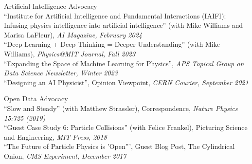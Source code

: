 \item Artificial Intelligence Advocacy\\ ``Institute for Artificial Intelligence and Fundamental Interactions (IAIFI): Infusing physics intelligence into artificial intelligence'' (with Mike Williams and Marisa LaFleur), \emph{AI Magazine,} \emph{February 2024}
\\ ``Deep Learning + Deep Thinking = Deeper Understanding'' (with Mike Williams), \emph{Physics@MIT Journal,} \emph{Fall 2023}
\\ ``Expanding the Space of Machine Learning for Physics'', \emph{APS Topical Group on Data Science Newsletter,} \emph{Winter 2023}
\\ ``Designing an AI Physicist'', Opinion Viewpoint, \emph{CERN Courier,} \emph{September 2021}
\item Open Data Advocacy\\ ``Slow and Steady'' (with Matthew Strassler), Correspondence, \emph{Nature Physics 15:725 (2019)}
\\ ``Guest Case Study 6:  Particle Collisions'' (with Felice Frankel), Picturing Science and Engineering, \emph{MIT Press,} \emph{2018}
\\ ``The Future of Particle Physics is 'Open''', Guest Blog Post, The Cylindrical Onion, \emph{CMS Experiment,} \emph{December 2017}
